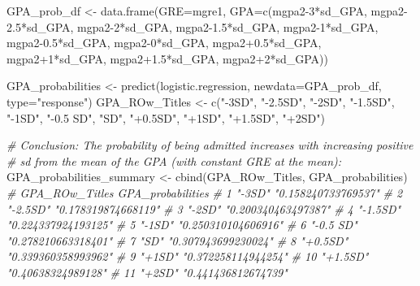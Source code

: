 \documentclass[
]{article}
\newenvironment{Shaded}{\begin{snugshade}}{\end{snugshade}}
\newcommand{\AttributeTok}[1]{\textcolor[rgb]{0.77,0.63,0.00}{#1}}
\newcommand{\CommentTok}[1]{\textcolor[rgb]{0.56,0.35,0.01}{\textit{#1}}}
\newcommand{\DecValTok}[1]{\textcolor[rgb]{0.00,0.00,0.81}{#1}}
\newcommand{\FloatTok}[1]{\textcolor[rgb]{0.00,0.00,0.81}{#1}}
\newcommand{\FunctionTok}[1]{\textcolor[rgb]{0.00,0.00,0.00}{#1}}
\newcommand{\NormalTok}[1]{#1}
\newcommand{\OtherTok}[1]{\textcolor[rgb]{0.56,0.35,0.01}{#1}}
\newcommand{\SpecialCharTok}[1]{\textcolor[rgb]{0.00,0.00,0.00}{#1}}
\newcommand{\StringTok}[1]{\textcolor[rgb]{0.31,0.60,0.02}{#1}}
\begin{document}
\begin{Shaded}
\begin{Highlighting}[]
\NormalTok{GPA\_prob\_df }\OtherTok{\textless{}{-}} \FunctionTok{data.frame}\NormalTok{(}\AttributeTok{GRE=}\NormalTok{mgre1, }\AttributeTok{GPA=}\FunctionTok{c}\NormalTok{(mgpa2}\DecValTok{{-}3}\SpecialCharTok{*}\NormalTok{sd\_GPA, mgpa2}\FloatTok{{-}2.5}\SpecialCharTok{*}\NormalTok{sd\_GPA, mgpa2}\DecValTok{{-}2}\SpecialCharTok{*}\NormalTok{sd\_GPA, mgpa2}\FloatTok{{-}1.5}\SpecialCharTok{*}\NormalTok{sd\_GPA, }
\NormalTok{                                                  mgpa2}\DecValTok{{-}1}\SpecialCharTok{*}\NormalTok{sd\_GPA, mgpa2}\FloatTok{{-}0.5}\SpecialCharTok{*}\NormalTok{sd\_GPA, mgpa2}\DecValTok{{-}0}\SpecialCharTok{*}\NormalTok{sd\_GPA, mgpa2}\FloatTok{+0.5}\SpecialCharTok{*}\NormalTok{sd\_GPA,}
\NormalTok{                                                  mgpa2}\SpecialCharTok{+}\DecValTok{1}\SpecialCharTok{*}\NormalTok{sd\_GPA, mgpa2}\FloatTok{+1.5}\SpecialCharTok{*}\NormalTok{sd\_GPA, mgpa2}\SpecialCharTok{+}\DecValTok{2}\SpecialCharTok{*}\NormalTok{sd\_GPA))}

\NormalTok{GPA\_probabilities }\OtherTok{\textless{}{-}} \FunctionTok{predict}\NormalTok{(logistic.regression, }\AttributeTok{newdata=}\NormalTok{GPA\_prob\_df, }\AttributeTok{type=}\StringTok{"response"}\NormalTok{)}
\NormalTok{GPA\_ROw\_Titles }\OtherTok{\textless{}{-}} \FunctionTok{c}\NormalTok{(}\StringTok{"{-}3SD"}\NormalTok{, }\StringTok{"{-}2.5SD"}\NormalTok{, }\StringTok{"{-}2SD"}\NormalTok{, }\StringTok{"{-}1.5SD"}\NormalTok{, }\StringTok{"{-}1SD"}\NormalTok{, }\StringTok{"{-}0.5 SD"}\NormalTok{, }\StringTok{"SD"}\NormalTok{, }\StringTok{"+0.5SD"}\NormalTok{, }\StringTok{"+1SD"}\NormalTok{, }\StringTok{"+1.5SD"}\NormalTok{,}
                    \StringTok{"+2SD"}\NormalTok{)}


\CommentTok{\# Conclusion: The probability of being admitted increases with increasing positive}
\CommentTok{\# sd from the mean of the GPA (with constant GRE at the mean):}
\NormalTok{GPA\_probabilities\_summary }\OtherTok{\textless{}{-}} \FunctionTok{cbind}\NormalTok{(GPA\_ROw\_Titles, GPA\_probabilities)}
    \CommentTok{\# GPA\_ROw\_Titles GPA\_probabilities  }
    \CommentTok{\# 1  "{-}3SD"         "0.158240733769537"}
    \CommentTok{\# 2  "{-}2.5SD"       "0.178319874668119"}
    \CommentTok{\# 3  "{-}2SD"         "0.200340463497387"}
    \CommentTok{\# 4  "{-}1.5SD"       "0.224337924193125"}
    \CommentTok{\# 5  "{-}1SD"         "0.250310104606916"}
    \CommentTok{\# 6  "{-}0.5 SD"      "0.278210663318401"}
    \CommentTok{\# 7  "SD"           "0.307943699230024"}
    \CommentTok{\# 8  "+0.5SD"       "0.339360358993962"}
    \CommentTok{\# 9  "+1SD"         "0.372258114944254"}
    \CommentTok{\# 10 "+1.5SD"       "0.40638324989128" }
    \CommentTok{\# 11 "+2SD"         "0.441436812674739"}



\end{Highlighting}
\end{Shaded}
\end{document}
